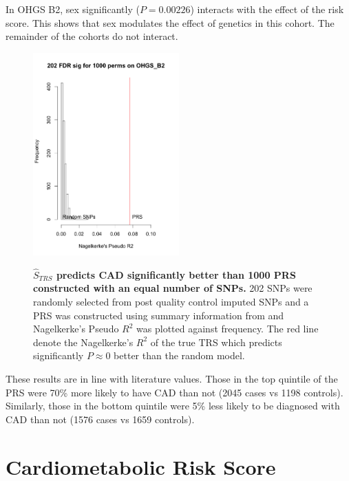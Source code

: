 In \ac{OHGS} B2, sex significantly ($P = 0.00226$) interacts with the effect of the risk score. This shows that sex modulates the effect of genetics in this cohort. The remainder of the cohorts do not interact.


\begin{figure}[H]
\centering
\includegraphics[width=0.5\textwidth]{Figures/b2.png}
\label{b2_perm}
\caption[$\hat{S}_{TRS}$ predicts \ac{CAD} significantly better than 1000 \ac{PRS} constructed with an equal number of \acp{SNP}.]{\textbf{$\hat{S}_{TRS}$ predicts \ac{CAD} significantly better than 1000 \ac{PRS} constructed with an equal number of \acp{SNP}.} 202 \acp{SNP} were randomly selected from post quality control imputed \acp{SNP} and a \ac{PRS} was constructed using summary information from \cite{TheCARDIoGRAMplusC4DConsortium2015} and Nagelkerke's Pseudo $R^2$ was plotted against frequency. The red line denote the Nagelkerke's $R^2$ of the true \ac{TRS} which predicts significantly $P \approx 0$ better than the random model.}
\end{figure}

These results are in line with literature values. Those in the top quintile of the \ac{PRS} were 70\% more likely to have \ac{CAD} than not (2045 cases vs 1198 controls). Similarly, those in the bottom quintile were  5\% less likely to be diagnosed with \ac{CAD} than not (1576 cases vs 1659 controls).



\section{Cardiometabolic Risk Score}

